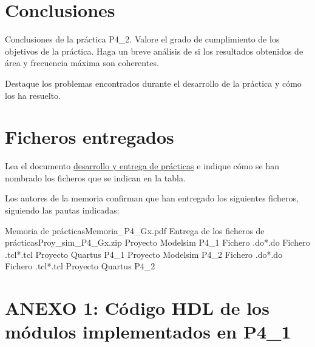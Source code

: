 \documentclass[parskip,a4paper,12pt]{article}
\newcommand{\fila}{}
\begin{document}
\section{Conclusiones}
\begin{enunciado}{}{}%
Conclusiones de la práctica P4\_2. Valore el grado de cumplimiento de los objetivos de la práctica. Haga un breve análisis de si los resultados obtenidos de área y frecuencia máxima son coherentes.  

Destaque los problemas encontrados durante el desarrollo de la práctica y cómo los ha resuelto.
\end{enunciado}


\section{Ficheros entregados}
\begin{enunciado}{}{}%
Lea el documento \href{https://gised.webs.upv.es/pds_fpga/PDS_FPGA_practicas.pdf} {desarrollo y entrega de prácticas}  e indique cómo se han nombrado los ficheros que se indican en la tabla.

\end{enunciado}

Los autores de la memoria confirman que han entregado los siguientes ficheros, siguiendo las pautas indicadas:

\def\colUNO{10cm}
\def\colDOS{4cm}

\begin{table}[H]
    \centering
    \label{tab:entregables}
\gdef\cabecera{\fila{FICHERO}{NOMBRE}}
\noindent\begin{mitabla}
\fila{Memoria de prácticas}{Memoria\_P4\_Gx.pdf}
\fila{Entrega de los ficheros de prácticas}{Proy\_sim\_P4\_Gx.zip}
\fila{Proyecto Modelsim P4\_1}{}
\fila{Fichero .do}{*.do}
\fila{Fichero .tcl}{*.tcl}
\fila{Proyecto Quartus P4\_1}{}
\fila{Proyecto Modelsim P4\_2}{}
\fila{Fichero .do}{*.do}
\fila{Fichero .tcl}{*.tcl}
\fila{Proyecto Quartus P4\_2}{}
\end{mitabla}
\end{table}


\section{ANEXO 1: Código HDL de los módulos implementados en P4\_1}
\end{document}
